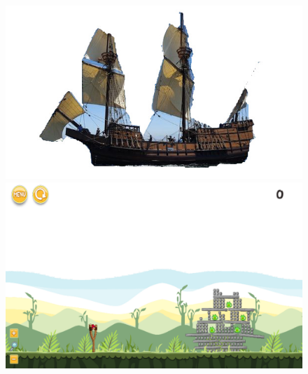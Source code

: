 \documentclass{dalthesis}
\begin{document}
\begin{figure}
  \includegraphics[width=\textwidth,height=\textheight,keepaspectratio]{levels/pictures/ships/galleon.jpg}
  \includegraphics[width=\textwidth,height=\textheight,keepaspectratio]{levels/screenshots/ships/galleon.png}
\end{figure}
\end{document}
